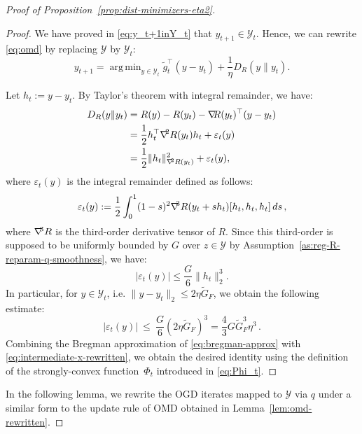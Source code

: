 \documentclass[a4paper,11pt,fullpage]{article}
\def\Y{{\mathcal Y}}
\theoremstyle{plain}
\theoremstyle{definition}
\theoremstyle{plain}
\DeclareMathOperator*{\argmin}{arg\,min}
\renewcommand{\leq}{~\le~}
\let\nablaold\nabla
\renewcommand{\nabla}{\nablaold\mkern-2.5mu}
\begin{document}
\begin{proof}[Proof of Proposition~\ref{prop:dist-minimizers-eta2}]
\begin{proof}
We have proved in \eqref{eq:y_t+1inY_t} that $y_{t+1} \in \Y_t$.  Hence, we can rewrite \eqref{eq:omd} by replacing $\Y$ by $\Y_t$: 
\begin{equation}
\label{eq:intermediate-x-rewritten}
y_{t+1} =\argmin_{y\in \Y_t} \tilde{g}_t^{\top}(y-y_t) +\frac{1}{\eta} D_R(y\|y_t). 
\end{equation}

Let $h_t :=y-y_t$. By Taylor's theorem with integral remainder, we have: 
\begin{align}
\label{eq:bregman-approx}
D_R(y\|y_t)
&=
R(y)-R(y_t)-\nabla R(y_t)^\top (y-y_t) \nonumber\\
&=
\frac12 h_t^\top \nabla^2 R(y_t)h_t
+
\varepsilon_t(y) \nonumber\\
&=
\frac12 \|h_t\|_{\nabla^2 R(y_t)}^2
+
\varepsilon_t(y),
\end{align}
where $\varepsilon_t(y)$ is the integral remainder defined as follows: 
\begin{equation*}
\varepsilon_t(y)
:= 
\frac12
\int_0^1
(1-s)^2
\nabla^3 R(y_t+s h_t)[h_t,h_t,h_t]\,ds\,,
\end{equation*}
where $\nabla^3 R$ is the third-order derivative tensor of $R$. 
Since this third-order is supposed to be uniformly bounded by $G$ over $z \in \Y$ by Assumption~\ref{as:reg-R-reparam-q-smoothness}, we have:
\begin{equation*}
|\varepsilon_t(y)|
\le
\frac{G}{6}\|h_t\|_2^3.
\end{equation*}
In particular, for \(y\in \mathcal Y_t\), i.e.
\(\|y-y_t\|_2\le 2 \eta \tilde{G}_F\), we obtain the following estimate: 
\begin{equation*}
|\varepsilon_t(y)| \leq \frac{G}{6} (2 \eta \tilde{G}_F)^3 = \frac{4}{3} G \tilde{G}_F^3 \eta^3\,.
\end{equation*}
Combining the Bregman approximation of \eqref{eq:bregman-approx} with \eqref{eq:intermediate-x-rewritten}, we obtain the desired identity using the definition of the strongly-convex function~$\Phi_t$ introduced in \eqref{eq:Phi_t}. 
\end{proof}

In the following lemma, we rewrite the OGD iterates mapped to $\Y$ via $q$ under a similar form to the update rule of OMD obtained in Lemma~\ref{lem:omd-rewritten}. 


\end{proof}
\end{document}
